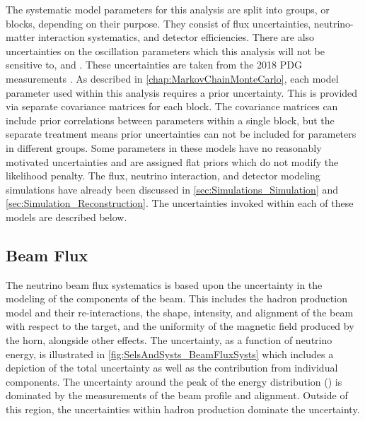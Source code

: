 The systematic model parameters for this analysis are split into groups, or blocks, depending on their purpose. They consist of flux uncertainties, neutrino-matter interaction systematics, and detector efficiencies. There are also uncertainties on the oscillation parameters which this analysis will not be sensitive to, \delmsqsol and \sinsqsol. These uncertainties are taken from the 2018 PDG measurements \cite{Tanabashi2018-hp}. As described in \autoref{chap:MarkovChainMonteCarlo}, each model parameter used within this analysis requires a prior uncertainty. This is provided via separate covariance matrices for each block. The covariance matrices can include prior correlations between parameters within a single block, but the separate treatment means prior uncertainties can not be included for parameters in different groups. Some parameters in these models have no reasonably motivated uncertainties and are assigned flat priors which do not modify the likelihood penalty. The flux, neutrino interaction, and detector modeling simulations have already been discussed in \autoref{sec:Simulations_Simulation} and \autoref{sec:Simulation_Reconstruction}. The uncertainties invoked within each of these models are described below.

\subsection{Beam Flux}
\label{sec:SelsAndSysts_Systs_BeamFlux}

The neutrino beam flux systematics is based upon the uncertainty in the modeling of the components of the beam. This includes the hadron production model and their re-interactions, the shape, intensity, and alignment of the beam with respect to the target, and the uniformity of the magnetic field produced by the horn, alongside other effects. The uncertainty, as a function of neutrino energy, is illustrated in \autoref{fig:SelsAndSysts_BeamFluxSysts} which includes a depiction of the total uncertainty as well as the contribution from individual components. The uncertainty around the peak of the energy distribution () is dominated by the measurements of the beam profile and alignment. Outside of this region, the uncertainties within hadron production dominate the uncertainty.


